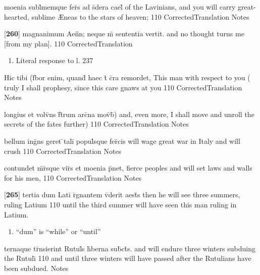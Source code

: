 \documentclass[]{book}
\begin{document}
\latline
  {moenia subl\={\macron {\i}}memque fer\={}s ad s\={\macron {\i}}dera cael\={\macron {\i}}}
  { of the Lavinians, and you will carry great-hearted, sublime {\AE}neas to the stars of heaven;  }
  {110}
  { CorrectedTranslation }
  { Notes }


\latline
  {[\textbf{260}] magnanimum Aen\={}\={}n; neque m\={} sententia vertit.}
  { and no thought turns me [from my plan]. }
  {110}
  { CorrectedTranslation }
  { \begin{enumerate}
  	\item Literal response to l. 237
  \end{enumerate} }


\latline
  {Hic tibi (f\={}bor enim, quand\={} haec t\={} c\={}ra remordet,}
  { This man with respect to you ( truly I shall prophesy, since this care gnaws at you }
  {110}
  { CorrectedTranslation }
  { Notes }


\latline
  {longius et volv\={}ns f\={}t\={}rum arc\={}na mov\={}b\={})}
  { and, even more, I shall move and unroll the secrets of the fates further) }
  {110}
  { CorrectedTranslation }
  { Notes }


\latline
  {bellum ing\={}ns geret \={}tali\={} popul\={}sque fer\={}cis}
  { will wage great war in Italy and will crush }
  {110}
  { CorrectedTranslation }
  { Notes }


\latline
  {contundet m\={}r\={}sque vir\={\macron {\i}}s et moenia p\={}net,}
  { fierce peoples and will set laws and walls for his men,  }
  {110}
  { CorrectedTranslation }
  { Notes }


\latline
  {[\textbf{265}] tertia dum Lati\={} r\={}gnantem v\={\macron {\i}}derit aest\={}s}
  { then he will see three summers, ruling Latium }
  {110}
  { until the third summer will have seen this man ruling in Latium. }
  { \begin{enumerate}
  	\item ``dum'' is ``while'' or ``until''
  \end{enumerate} }


\latline
  {ternaque tr\={}nsierint Rutul\={\macron {\i}}s h\={\macron {\i}}berna sub\={}ct\={\macron {\i}}s.}
  { and will endure three winters subduing the Rutul\={\i} }
  {110}
  { and until three winters will have passed after the Rutulians have been subdued. }
  { Notes }
\end{document}
